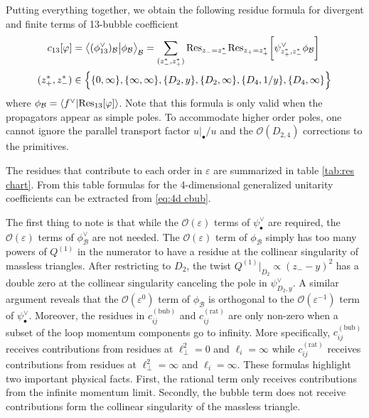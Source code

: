 \documentclass[11pt]{article}
\newcommand{\nn}{\nonumber}
\newcommand{\la}{\langle}
\newcommand{\ra}{\rangle}
\renewcommand{\O}{\mathcal{O}}
\newcommand{\B}{\mathcal{B}}
\newcommand{\res}{{\rm Res}}
\newcommand{\vphi}{\varphi}
\newcommand{\vep}{\varepsilon}
\begin{document}
Putting everything together, we obtain the following residue formula for divergent and finite terms of 13-bubble coefficient
\begin{align} \label{eq:4d cbub}
	c_{13}[\vphi] 
	&= \big\la 
		(\phi^\vee_{13})_\B
	\big\vert 
		 \phi_\B
	\big\ra_{\B}
	= \sum_{(z_-^*,z_+^*)} \res_{z_-=z_-^*} \res_{z_+=z_+^*}
		\bigg[\psi^\vee_{z_+^*,z_-^*}\phi_\B\bigg]
	\\
	(z_+^*,z_-^*) &\in \Big\{ \{0,\infty\},\{\infty,\infty\},
		\{D_2,y\},\{D_2,\infty\} ,\{D_4,1/y\},\{D_4,\infty\} \Big\}
\end{align}
where $\phi_\B = \la f^\vee \vert \res_{13}[\vphi] \ra$. Note that this formula is only valid when the propagators appear as simple poles. To accommodate higher order poles, one cannot ignore the parallel transport factor $u\vert_\bullet/u$ and the $\O(D_{2,4})$ corrections to the primitives. 

The residues that contribute to each order in $\vep$ are summarized in table \ref{tab:res chart}. From this table formulas for the 4-dimensional generalized unitarity coefficients can be extracted from \eqref{eq:4d cbub}. 

The first thing to note is that while the $\O(\vep)$ terms of $\psi^\vee_\bullet$ are required, the $\O(\vep)$ terms of $\phi^\vee_\B$ are not needed. 
The $\O(\vep)$ term of $\phi_\B$ simply has too many powers of $Q^{(1)}$ in the numerator to have a residue at the collinear singularity of massless triangles. 
After restricting to $D_2$, the twist $Q^{(1)}\vert_{D_2}\propto (z_--y)^2$ has a double zero at the collinear singularity canceling the pole in $\psi^\vee_{D_2,y}$. A similar argument reveals that the $\O(\vep^0)$ term of  $\phi_\B$  is orthogonal to the $\O(\vep^{-1})$ term of $\psi^\vee_\bullet$.
Moreover, the residues in $c_{ij}^{(\text{bub})}$ and $c_{ij}^{(\text{rat})}$ are only non-zero when a subset of the loop momentum components go to infinity. More specifically, $c_{ij}^{(\text{bub})}$ receives contributions from residues at $\ell_\perp^2 = 0$ and $\ell_i=\infty$ while $c_{ij}^{(\text{rat})}$ receives contributions from residues at $\ell_\perp^2 = \infty$ and $\ell_i = \infty$.
These formulas highlight two important physical facts. First, the rational term only receives contributions from the infinite momentum limit. 
Secondly, the bubble term does not receive contributions form the collinear singularity of the massless triangle. 
\end{document}
